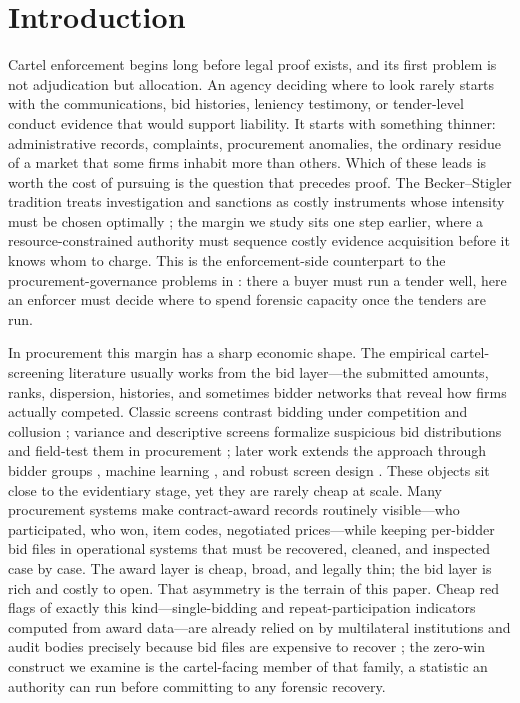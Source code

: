 %
\section{Introduction}
\label{sec:intro}

Cartel enforcement begins long before legal proof exists, and its
first problem is not adjudication but allocation. An agency deciding
where to look rarely starts with the communications, bid histories,
leniency testimony, or tender-level conduct evidence that would
support liability. It starts with something thinner: administrative
records, complaints, procurement anomalies, the ordinary residue of a
market that some firms inhabit more than others. Which of these leads
is worth the cost of pursuing is the question that precedes proof.
The Becker--Stigler tradition treats investigation and sanctions as
costly instruments whose intensity must be chosen optimally
\citep{becker1968crime,stigler1970optimum}; the margin we study sits
one step earlier, where a resource-constrained authority must
sequence costly evidence acquisition before it knows whom to charge.
This is the enforcement-side counterpart to the procurement-governance
problems in \citet{decarolis2020bureaucratic}: there a buyer must run
a tender well, here an enforcer must decide where to spend forensic
capacity once the tenders are run.

In procurement this margin has a sharp economic shape. The empirical
cartel-screening literature usually works from the bid layer---the
submitted amounts, ranks, dispersion, histories, and sometimes bidder
networks that reveal how firms actually competed. Classic screens
contrast bidding under competition and collusion
\citep{porter1993detection,bajari2003deciding}; variance and
descriptive screens formalize suspicious bid distributions
\citep{abrantesmetz2006a,harrington2008detecting} and field-test them
in procurement \citep{imhof2018screening,imhof2019detecting}; later
work extends the approach through bidder groups
\citep{conley2016detecting}, machine learning
\citep{huber2019machine,wallimann2023machine}, and robust screen
design \citep{chassang2022robust}. These objects sit close to the
evidentiary stage, yet they are rarely cheap at scale. Many
procurement systems make contract-award records routinely
visible---who participated, who won, item codes, negotiated
prices---while keeping per-bidder bid files in operational systems
that must be recovered, cleaned, and inspected case by case. The
award layer is cheap, broad, and legally thin; the bid layer is rich
and costly to open. That asymmetry is the terrain of this paper. Cheap
red flags of exactly this kind---single-bidding and
repeat-participation indicators computed from award data---are already
relied on by multilateral institutions and audit bodies precisely
because bid files are expensive to recover
\citep{fazekas2020uncovering,oecd2022datascreening}; the zero-win
construct we examine is the cartel-facing member of that family, a
statistic an authority can run before committing to any forensic
recovery.

